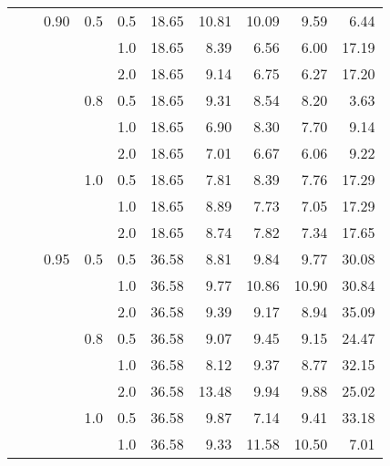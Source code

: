 \documentclass{article}
\begin{document}
{\begin{tabular}{lllllrrrrr}
            &     & 0.90 & 0.5 & 0.5 &   18.65 &   10.81 &             10.09 &                 9.59 &       6.44 \\
            &     &      &     & 1.0 &   18.65 &    8.39 &              6.56 &                 6.00 &      17.19 \\
            &     &      &     & 2.0 &   18.65 &    9.14 &              6.75 &                 6.27 &      17.20 \\
            &     &      & 0.8 & 0.5 &   18.65 &    9.31 &              8.54 &                 8.20 &       3.63 \\
            &     &      &     & 1.0 &   18.65 &    6.90 &              8.30 &                 7.70 &       9.14 \\
            &     &      &     & 2.0 &   18.65 &    7.01 &              6.67 &                 6.06 &       9.22 \\
            &     &      & 1.0 & 0.5 &   18.65 &    7.81 &              8.39 &                 7.76 &      17.29 \\
            &     &      &     & 1.0 &   18.65 &    8.89 &              7.73 &                 7.05 &      17.29 \\
            &     &      &     & 2.0 &   18.65 &    8.74 &              7.82 &                 7.34 &      17.65 \\
            &     & 0.95 & 0.5 & 0.5 &   36.58 &    8.81 &              9.84 &                 9.77 &      30.08 \\
            &     &      &     & 1.0 &   36.58 &    9.77 &             10.86 &                10.90 &      30.84 \\
            &     &      &     & 2.0 &   36.58 &    9.39 &              9.17 &                 8.94 &      35.09 \\
            &     &      & 0.8 & 0.5 &   36.58 &    9.07 &              9.45 &                 9.15 &      24.47 \\
            &     &      &     & 1.0 &   36.58 &    8.12 &              9.37 &                 8.77 &      32.15 \\
            &     &      &     & 2.0 &   36.58 &   13.48 &              9.94 &                 9.88 &      25.02 \\
            &     &      & 1.0 & 0.5 &   36.58 &    9.87 &              7.14 &                 9.41 &      33.18 \\
            &     &      &     & 1.0 &   36.58 &    9.33 &             11.58 &                10.50 &       7.01 \\

\end{tabular}}
\end{document}
